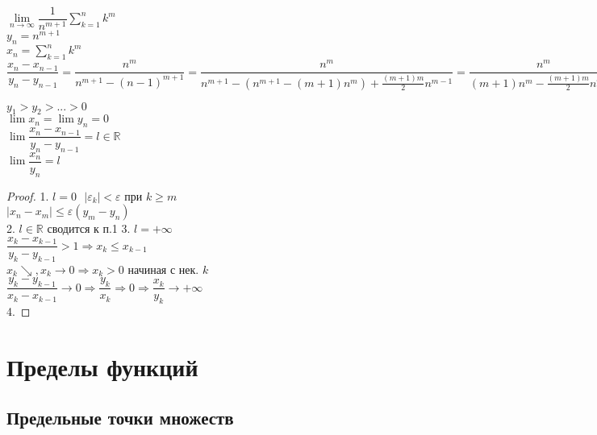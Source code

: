 $ \lim\limits_{n \rightarrow \infty} \dfrac{1}{n^{m+1}} \sum_{k=1}^{n} k^m $ \\
$ y_n = n^{m+1} $ \\
$ x_n = \sum_{k=1}^{n} k^m $ \\
$ \dfrac{x_n - x_{n-1}}{y_n - y_{n-1}} = \dfrac{n^m}{n^{m+1}- (n-1)^{m+1}} = \dfrac{n^m}{n^{m+1} - (n^{m+1} - (m+1)n^m) + \frac{(m+1)m}{2} n^{m-1}} = \dfrac{n^m}{(m+1) n^m - \frac{(m+1)m}{2} n^{m-1} } = \dfrac{1}{m+1} $ \\
	
	
\begin{theorem}
	$ y_1 > y_2 > ... > 0 $ \\
	$ \lim x_n = \lim y_n = 0 $ \\
	$ \lim \dfrac{x_n - x_{n-1}}{y_n - y_{n-1}} = l \in \mathbb{R} $ \\
	$ \lim \dfrac{x_n}{y_n} = l $ \\
	\begin{proof}
		1. $l = 0 \ \ \ | \varepsilon_k | < \varepsilon $ при $ k \geq m $ \\
		$ | x_n - x_m | \leq \varepsilon (y_m - y_n) $ \\
		2. $ l \in \mathbb{R} $ сводится к п.1
		3. $ l = + \infty $ \\
		$ \dfrac{ x_k - x_{k-1}}{y_k - y_{k-1}} > 1 \Rightarrow x_k \leq x_{k-1} $\\
		$ x_k \searrow, x_k \rightarrow 0 \Rightarrow x_k > 0$ начиная с нек. $k$ \\
		$ \dfrac{y_k - y_{k-1}}{x_k - x_{k-1}} \rightarrow 0 \Rightarrow \dfrac{y_k}{x_k} \Rightarrow 0 \Rightarrow \dfrac{x_k}{y_k} \rightarrow +\infty $\\
		4. 
 	\end{proof}
\end{theorem}

\section{Пределы функций}

\subsection{Предельные точки множеств}

